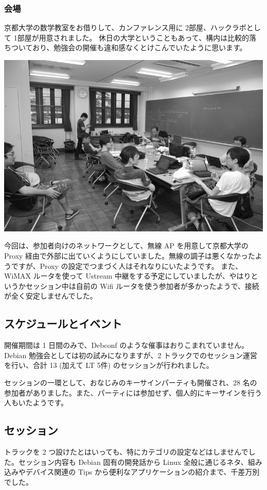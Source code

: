 \documentclass[mingoth,a4paper]{jsarticle}
\begin{document}
\subsubsection{会場}

京都大学の数学教室をお借りして、カンファレンス用に 2部屋、ハックラボとして 1部屋が用意されました。
休日の大学ということもあって、構内は比較的落ちついており、勉強会の開催も違和感なくとけこんでいたように思います。

\includegraphics[width=0.8\hsize]{image201206/gum2012-hacklab_mono.jpg}

今回は、参加者向けのネットワークとして、無線 AP を用意して京都大学の Proxy 経由で外部に出ていくようにしていました。無線の調子は悪くなかったようですが、Proxy の設定でつまづく人はそれなりにいたようです。
また、WiMAX ルータを使って Ustream 中継をする予定にしていましたが、やはりというかセッション中は自前の Wifi ルータを使う参加者が多かったようで、接続が全く安定しませんでした。

\subsection{スケジュールとイベント}

開催期間は 1 日間のみで、Debconf のような催事はおりこまれていません。Debian 勉強会としては初の試みになりますが、2 トラックでのセッション運営を行い、合計 13 (加えて LT 5件) のセッションが行われました。

セッションの一環として、おなじみのキーサインパーティも開催され、28 名の参加者がありました。また、パーティには参加せず、個人的にキーサインを行う人もいたようです。

\subsection{セッション}

トラックを 2 つ設けたとはいっても、特にカテゴリの設定などはしませんでした。セッション内容も Debian 固有の開発話から Linux 全般に通じるネタ、組み込みやデバイス関連の Tips から便利なアプリケーションの紹介まで、千差万別でした。
\end{document}
